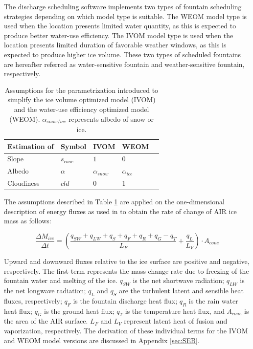 \documentclass[tc, manuscript]{copernicus}
\begin{document}
The discharge scheduling software implements two types of fountain scheduling strategies depending on which
model type is suitable. The WEOM model type is used when the location presents limited water quantity, as this
is expected to produce better water-use efficiency. The IVOM model type is used when the location presents
limited duration of favorable weather windows, as this is expected to produce higher ice volume. These two types
of scheduled fountains are hereafter referred as water-sensitive fountain and weather-sensitive fountain,
respectively.

\begin{table}[htb]
\centering
\caption{Assumptions for the parametrization introduced to simplify the ice volume optimized model (IVOM) and the
water-use efficiency optimized model (WEOM). $\alpha_{snow/ice}$ represents albedo of snow or ice.}
\label{tab:assumptions}
\begin{tabular}{@{}lllll@{}}
\toprule
\textbf{Estimation of} & \textbf{Symbol} & \textbf{IVOM} & \textbf{WEOM} & \\ \midrule
\multicolumn{1}{|l}{Slope}        & $s_{cone}$ & $ 1 $ & $0$ & \multicolumn{1}{l|}{} \\ \midrule
\multicolumn{1}{|l}{Albedo} & $\alpha$ & $\alpha_{snow}$ & $\alpha_{ice}$ & \multicolumn{1}{l|}{} \\\midrule 
\multicolumn{1}{|l}{Cloudiness}  & $cld$ & $0$ & $1$ & \multicolumn{1}{l|}{} \\ \bottomrule
\end{tabular}
\end{table}

The assumptions described in Table \ref{tab:assumptions} are applied on the one-dimensional description of
energy fluxes as used in \cite{balasubramanianInfluenceMeteorologicalConditions2022} to obtain the rate of
change of AIR ice mass as follows: 

\begin{equation}
  \frac{\Delta M_{ice}}{\Delta t}  =  (\frac{q_{SW} + q_{LW} + q_{S} + q_{F} + q_{R} + q_{G} - q_{T}}{L_F} + \frac{q_{L}}{L_V} ) \cdot A_{cone}
	\label{eqn:auto}
\end{equation}

Upward and downward fluxes relative to the ice surface are positive and negative, respectively. The first term
represents the mass change rate due to freezing of the fountain water and melting of the ice. $q_{SW}$ is the
net shortwave radiation; $q_{LW}$ is the net longwave radiation; $q_{L}$ and $q_{S}$ are the turbulent latent
and sensible heat fluxes, respectively; $q_{F}$ is the fountain discharge heat flux; $q_{R}$ is the rain water
heat flux; $q_{G}$ is the ground heat flux; $q_{T}$ is the temperature heat flux, and $A_{cone}$ is the area of
the AIR surface. $L_F$ and $L_{V}$ represent latent heat of fusion and vaporization, respectively. The
derivation of these individual terms for the IVOM and WEOM model versions are discussed in Appendix
\ref{sec:SEB}.
\end{document}
